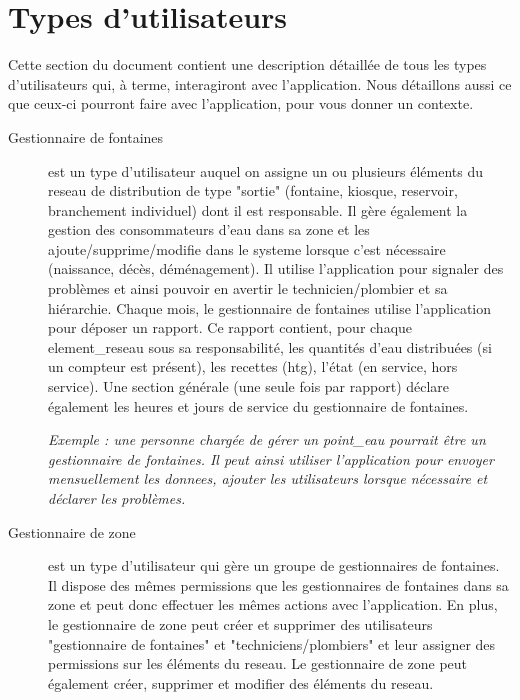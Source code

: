 \documentclass[a4paper, 11pt]{article}
\begin{document}
\section{Types d'\glspl{utilisateur}}
\label{users}
Cette section du document contient une description détaillée de tous les types d'\glspl{utilisateur} qui, à terme, interagiront avec l'\gls{application}. Nous détaillons aussi ce que ceux-ci pourront faire avec l'\gls{application}, pour vous donner un contexte.

  \begin{description}
    \item[Gestionnaire de \glspl{fontaine}] est un type d'\gls{utilisateur} auquel on assigne un ou plusieurs éléments du \gls{reseau} de distribution de type "sortie" (\gls{fontaine}, \gls{kiosque}, \gls{reservoir}, branchement individuel) dont il est responsable.
    Il gère également la gestion des \glspl{consommateur} d'eau dans sa \gls{zone} et les ajoute/supprime/modifie dans le \gls{systeme} lorsque c'est nécessaire (naissance, décès, déménagement).
    Il utilise l'\gls{application} pour signaler des problèmes et ainsi pouvoir en avertir le technicien/plombier et sa hiérarchie. Chaque mois, le gestionnaire de \glspl{fontaine} utilise l'\gls{application} pour déposer un rapport. Ce rapport contient, pour chaque \gls{element_reseau} sous sa responsabilité, les quantités d'eau distribuées (si un compteur est présent), les recettes (\gls{htg}), l'état (en service, hors service). Une section générale (une seule fois par rapport) déclare également les heures et jours de service du gestionnaire de \glspl{fontaine}.

    \emph{Exemple : une personne chargée de gérer un \gls{point_eau} pourrait être un gestionnaire de \glspl{fontaine}. Il peut ainsi utiliser l'\gls{application} pour envoyer mensuellement les \glspl{donnee}, ajouter les \glspl{utilisateur} lorsque nécessaire et déclarer les problèmes.}

    \item[Gestionnaire de \gls{zone}] est un type d'\gls{utilisateur} qui gère un groupe de gestionnaires de \glspl{fontaine}. Il dispose des mêmes \glspl{permission} que les gestionnaires de \glspl{fontaine} dans sa \gls{zone} et peut donc effectuer les mêmes actions avec l'\gls{application}. En plus, le gestionnaire de \gls{zone} peut créer et supprimer des \glspl{utilisateur} "gestionnaire de \glspl{fontaine}" et  "techniciens/plombiers" et leur assigner des \glspl{permission} sur les éléments du \gls{reseau}. Le gestionnaire de \gls{zone} peut également créer, supprimer et modifier des éléments du \gls{reseau}.


\end{description}
\end{document}
